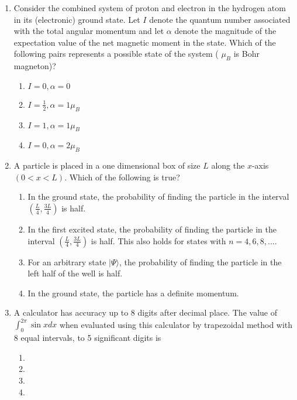 \documentclass[journal]{IEEEtran}
\begin{document}
\begin{enumerate}
    \item Consider the combined system of proton and electron in the hydrogen atom in its (electronic) ground state. Let $I$ denote the quantum number associated with the total angular momentum and let $\alpha$ denote the magnitude of the expectation value of the net magnetic moment in the state. Which of the following pairs represents a possible state of the system ( $\mu_B$ is Bohr magneton)?
    \begin{multicols}{4}
            \begin{enumerate}
        \item $I=0,\alpha =0$
        \item $I=\frac{1}{2},\alpha =1\mu_B$
        \item $I=1,\alpha =1 \mu_B$
        \item $I=0,\alpha=2\mu_B$
        \end{enumerate}
        \end{multicols}
    \item A particle is placed in a one dimensional box of size $L$ along the $x$-axis $(0<x<L)$. Which of the following is true?
    
            \begin{enumerate}
             \item In the ground state, the probability of finding the particle in the interval $(\frac{L}{4},\frac{3 L}{4})$ is half.
\item In the first excited state, the probability of finding the particle in the interval $(\frac{L}{4},\frac{3 L}{4})$ is half. This also holds for states with $n=4,6,8, ....$
\item For an arbitrary state $|\Psi\rangle$, the probability of finding the particle in the left half of the well is half.
\item In the ground state, the particle has a definite momentum. 
              \end{enumerate}
        
    \item A calculator has accuracy up to 8 digits after decimal place. The value of $\int_{0}^{2 \pi} \sin x d x$ when evaluated using this calculator by trapezoidal method with 8 equal intervals, to 5 significant digits is
 \begin{enumerate}
	\item 
	\item 
	\item 
	\item  
 

\end{enumerate}
\end{enumerate}
\end{document}
